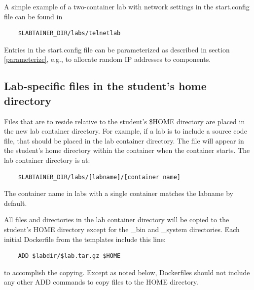 \documentclass[12pt]{article}
\begin{document}
A simple example of a two-container lab with network settings in the start.config file can be found in 
\begin{verbatim}
    $LABTAINER_DIR/labs/telnetlab
\end{verbatim}
Entries in the start.config file can be parameterized as described in section \ref{parameterize}, e.g., to allocate
random IP addresses to components.


\subsection {Lab-specific files in the student's home directory}
\label{home files}
Files that are to reside relative to the student's \$HOME directory are placed in the 
new lab container directory.  For example, if a lab is to include a source code file, that
should be placed in the lab container directory. The file will appear in the student's
home directory within the container when the container starts.  The lab container
directory is at:  

\begin{verbatim}
    $LABTAINER_DIR/labs/[labname]/[container name]
\end{verbatim}
The container name in labs with a single container matches the labname by default.

All files and directories in the lab container directory will be copied to the student's HOME
directory except for the \_bin and \_system directories.
Each initial Dockerfile from the templates include this line:
\begin{verbatim}
    ADD $labdir/$lab.tar.gz $HOME
\end{verbatim}
to accomplish the copying. Except as noted below, Dockerfiles should not include any other ADD commands
to copy files to the HOME directory.
\end{document}
